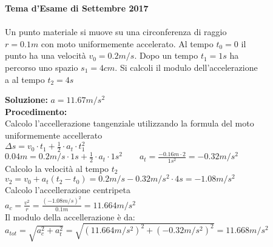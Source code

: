 \begin{figure}[h!]
\textbf{Tema d'Esame di Settembre 2017}\\ \\
Un punto materiale si muove su una circonferenza di raggio $r = 0.1 m$ con moto
uniformemente accelerato. Al tempo $t_0 = 0$ il punto ha una velocità $v_0 = 0.2 m/s$.
Dopo un tempo $t_1 = 1 s$ ha percorso uno spazio $s_1 = 4 cm$. Si calcoli il modulo
dell’accelerazione a al tempo $t_2 = 4 s$
\begin{boxed}
    \null\hfill \textbf{Soluzione:} $a = 11.67m/s^2$\\
    \textbf{Procedimento:}  \\ 
Calcolo l'accellerazione tangenziale utilizzando la formula del moto uniformemente accellerato\\
$\Delta s=v_0\cdot t_1+\frac{1}{2}\cdot a_t\cdot t_1^2$\\
$0.04m=0.2m/s\cdot 1s +\frac{1}{2}\cdot a_t \cdot 1s^2 \qquad a_t=\frac{-0.16m\cdot 2}{1s^2}=-0.32m/s^2$\\
Calcolo la velocità al tempo $t_2$\\
$v_2=v_0+a_t(t_2-t_0)=0.2m/s-0.32m/s^2\cdot 4s=-1.08m/s^2 $\\
Calcolo l'accellerazione centripeta\\
$a_c=\frac{v^2}{r}=\frac{(-1.08m/s)^2}{0.1m}=11.664m/s^2$\\
Il modulo della accellerazione è da:\\
$a_{tot}=\sqrt{a_c^2+a_t^2}=\sqrt{(11.664m/s^2)^2+(-0.32m/s^2)^2}=11.668m/s^2$
\end{boxed}
\end{figure}

